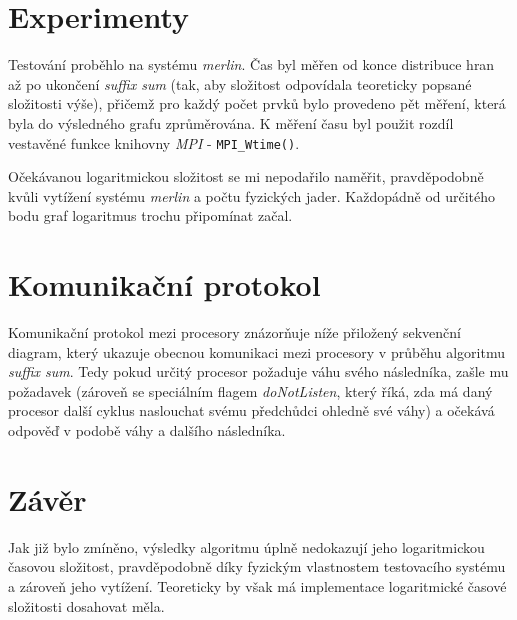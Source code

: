 \documentclass[12pt]{article}
\begin{document}
\section{Experimenty}

Testování proběhlo na systému \textit{merlin}. Čas byl měřen od konce distribuce hran až po ukončení \textit{suffix sum} (tak, aby složitost odpovídala teoreticky popsané složitosti výše), přičemž pro každý počet prvků bylo provedeno pět měření, která byla do výsledného grafu zprůměrována. K měření času byl použit rozdíl vestavěné funkce knihovny \textit{MPI} - \verb|MPI_Wtime()|.

Očekávanou logaritmickou složitost se mi nepodařilo naměřit, pravděpodobně kvůli vytížení systému \textit{merlin} a počtu fyzických jader. Každopádně od určitého bodu graf logaritmus trochu připomínat začal.

\newpage
\section{Komunikační protokol}
Komunikační protokol mezi procesory znázorňuje níže přiložený sekvenční diagram, který ukazuje obecnou komunikaci mezi procesory v průběhu algoritmu \textit{suffix sum}. Tedy pokud určitý procesor požaduje váhu svého následníka, zašle mu požadavek (zároveň se speciálním flagem \textit{doNotListen}, který říká, zda má daný procesor další cyklus naslouchat svému předchůdci ohledně své váhy) a očekává odpověď v podobě váhy a dalšího následníka.

\vspace{15cm}
\section{Závěr}
Jak již bylo zmíněno, výsledky algoritmu úplně nedokazují jeho logaritmickou časovou složitost, pravděpodobně díky fyzickým vlastnostem testovacího systému a zároveň jeho vytížení. Teoreticky by však má implementace logaritmické časové složitosti dosahovat měla. 
\end{document}
